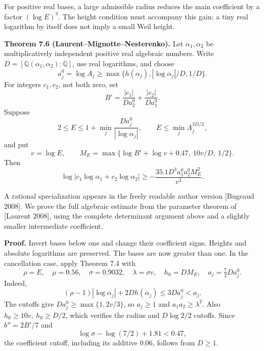 \documentclass[
  11pt,
  a4paper,
]{article}
\begin{document}
For positive real bases, a large admissible radius reduces the main
coefficient by a factor \((\log E)^3\). The height condition must
accompany this gain: a tiny real logarithm by itself does not imply a
small Weil height.

\textbf{Theorem 7.6 (Laurent--Mignotte--Nesterenko).} Let
\(\alpha_1,\alpha_2\) be multiplicatively independent positive real
algebraic numbers. Write \(D=[\mathbb Q(\alpha_1,\alpha_2):\mathbb Q]\),
use real logarithms, and choose \[
a_j^0=\log A_j\ge\max\{h(\alpha_j),|\log\alpha_j|/D,1/D\}.
\] For integers \(c_1,c_2\), not both zero, set \[
B'=\frac{|c_1|}{Da_2^0}+\frac{|c_2|}{Da_1^0}.
\] Suppose \[
2\le E\le 1+\min_j\frac{Da_j^0}{|\log\alpha_j|},
\qquad E\le\min_j A_j^{3D/2},
\] and put \[
v=\log E,\qquad
M_E=\max\{\log B'+\log v+0.47,\ 10v/D,\ 1/2\}.
\] Then \[
\log|c_1\log\alpha_1+c_2\log\alpha_2|
\ge-\frac{35.1D^4a_1^0a_2^0M_E^2}{v^3}. \tag{7.31}
\]

A rational specialization appears in the freely readable author version
{[}Bugeaud 2008{]}. We prove the full algebraic estimate from the
parameter theorem of {[}Laurent 2008{]}, using the complete determinant
argument above and a slightly smaller intermediate coefficient.

\textbf{Proof.} Invert bases below one and change their coefficient
signs. Heights and absolute logarithms are preserved. The bases are now
greater than one. In the cancellation case, apply Theorem 7.4 with \[
\rho=E,\quad\mu=0.56,\quad\sigma=0.9032,\quad
\lambda=\sigma v,\quad h_0=DM_E,\quad
a_j=\tfrac72 Da_j^0.
\] Indeed, \[
(\rho-1)|\log\alpha_j|+2Dh(\alpha_j)\le3Da_j^0<a_j.
\] The cutoffs give \(Da_j^0\ge\max\{1,2v/3\}\), so \(a_j\ge1\) and
\(a_1a_2\ge\lambda^2\). Also \(h_0\ge10v,\ h_0\ge D/2\), which verifies
the radius and \(D\log2/2\) cutoffs. Since \(b''=2B'/7\) and \[
\log\sigma-\log(7/2)+1.81<0.47,
\] the coefficient cutoff, including its additive \(0.06\), follows from
\(D\ge1\).
\end{document}
